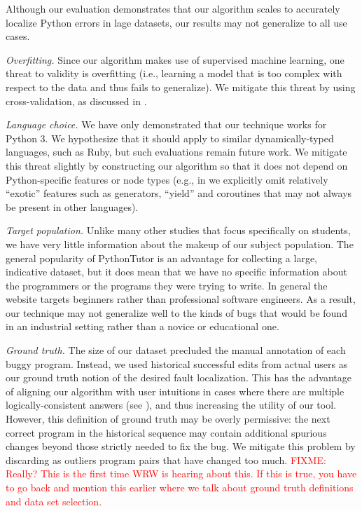 \documentclass[conference]{IEEEtran}
\newcommand{\fixme}[1]{\textcolor{red}{FIXME: #1}}
\begin{document}
Although our evaluation demonstrates that our algorithm scales to
accurately localize Python errors in lage datasets, our results may not
generalize to all use cases. 

\emph{Overfitting.} Since our algorithm makes use of supervised machine
learning, one threat to validity is overfitting (i.e., learning a model
that is too complex with respect to the data and thus fails to generalize).
We mitigate this threat by using cross-validation, as discussed in
. 

\emph{Language choice.} We have only demonstrated that our technique works
for Python 3. We hypothesize that it should apply to similar
dynamically-typed languages, such as Ruby, but such evaluations remain
future work. We mitigate this threat slightly by constructing our algorithm 
so that it does not depend on Python-specific features or node types
(e.g., in  we explicitly omit relatively ``exotic'' 
features such as generators, ``yield'' and coroutines that may not always
be present in other languages).

\emph{Target population.} Unlike many other studies that focus specifically
on students, we have very little information about the makeup of our
subject population. The general popularity of PythonTutor is an advantage
for collecting a large, indicative dataset, but it does mean that we have
no specific information about the programmers or the programs they were
trying to write. In general the website targets beginners rather than
professional software engineers. As a result, our technique may not
generalize well to the kinds of bugs that would be found in an industrial
setting rather than a novice or educational one.

\emph{Ground truth.} The size of our dataset precluded the manual annotation 
of each buggy program. Instead, we used historical successful
edits from actual users as our ground truth notion of the desired fault
localization. This has the advantage of aligning our algorithm with user
intuitions in cases where there are multiple logically-consistent answers
(see ), and thus increasing the utility of our tool. However,
this definition of ground truth may be overly permissive: the next
correct program in the historical sequence may contain additional spurious
changes beyond those strictly needed to fix the bug.
We mitigate this problem by discarding as outliers program pairs that have
changed too much. \fixme{Really? This is the first time WRW is hearing
about this. If this is true, you have to go back and mention this earlier
where we talk about ground truth definitions and data set selection.} 
\end{document}
